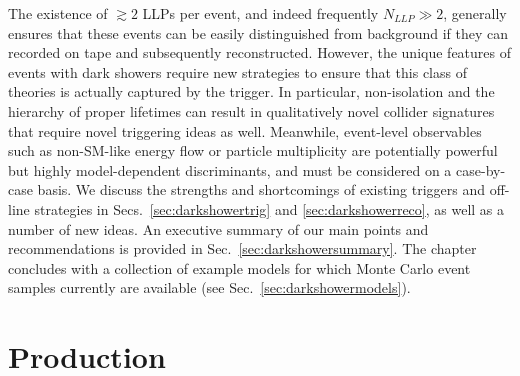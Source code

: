 The existence of $\gtrsim 2$ LLPs per event, and indeed frequently
$N_{LLP}\gg 2$, generally ensures that these events can be easily
distinguished from background if they can recorded on tape and subsequently reconstructed.
However, the unique features of events with dark showers require new
strategies to ensure that this class of theories is actually captured
by the trigger.  In particular, non-isolation and the hierarchy of
proper lifetimes can result in qualitatively novel collider signatures
that require novel triggering ideas as well.  Meanwhile, event-level observables such as non-SM-like energy flow or particle multiplicity are potentially powerful but highly model-dependent discriminants, and must be considered on a case-by-case basis.
We discuss the strengths and shortcomings of existing triggers and off-line strategies in Secs.~\ref{sec:darkshowertrig} and \ref{sec:darkshowerreco}, as well as a number of new ideas. An executive summary of our main points and recommendations is provided in Sec.~\ref{sec:darkshowersummary}. The chapter concludes with a collection of example models for which 
Monte Carlo event samples currently are available (see Sec.~\ref{sec:darkshowermodels}).

\section{Production}
\label{sec:darkshowerprod}

